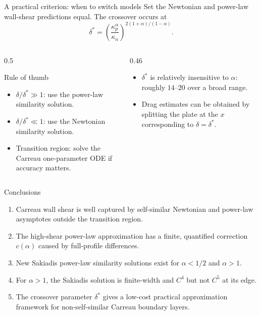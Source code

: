 \documentclass[aspectratio=169,11pt]{beamer}
\begin{document}
\begin{frame}{A practical criterion: when to switch models}
Set the Newtonian and power-law wall-shear predictions equal. The crossover occurs at
\[
  \delta^*=
  \left(\frac{\kappa_p^\alpha}{\kappa_n}\right)^{2(1+\alpha)/(1-\alpha)}.
\]
\begin{columns}[T,onlytextwidth]
\begin{column}{0.5\textwidth}
\begin{block}{Rule of thumb}
\begin{itemize}
  \item $\delta/\delta^*\gg1$: use the power-law similarity solution.
  \item $\delta/\delta^*\ll1$: use the Newtonian similarity solution.
  \item Transition region: solve the Carreau one-parameter ODE if accuracy matters.
\end{itemize}
\end{block}
\end{column}
\begin{column}{0.46\textwidth}
\begin{itemize}
  \item $\delta^*$ is relatively insensitive to $\alpha$: roughly $14$--$20$ over a broad range.
  \item Drag estimates can be obtained by splitting the plate at the $x$ corresponding to $\delta=\delta^*$.
\end{itemize}
\end{column}
\end{columns}
\end{frame}

\begin{frame}{Conclusions}
\begin{enumerate}
  \item Carreau wall shear is well captured by self-similar Newtonian and power-law asymptotes outside the transition region.
  \item The high-shear power-law approximation has a finite, quantified correction $c(\alpha)$ caused by full-profile differences.
  \item New Sakiadis power-law similarity solutions exist for $\alpha<1/2$ and $\alpha>1$.
  \item For $\alpha>1$, the Sakiadis solution is finite-width and $C^4$ but not $C^5$ at its edge.
  \item The crossover parameter $\delta^*$ gives a low-cost practical approximation framework for non-self-similar Carreau boundary layers.
\end{enumerate}
\end{frame}
\end{document}
